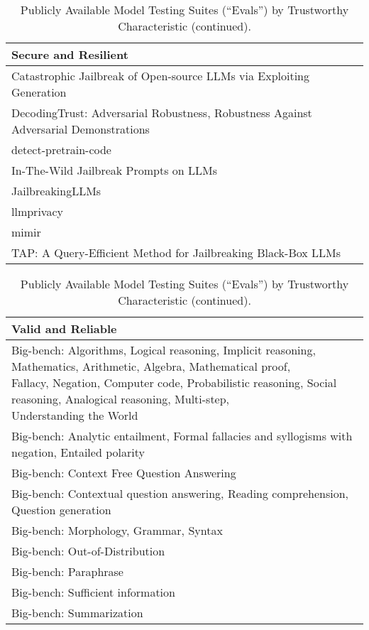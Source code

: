 \documentclass[fleqn]{article}
\begin{document}
\begin{table}[H]
	\caption*{Publicly Available Model Testing Suites (``Evals'') by Trustworthy Characteristic (continued).}
	\label{tab:low_risk_measure_by_tc_cont}
	\footnotesize
	\begin{tabular}{l}
		\toprule
		Secure and Resilient \\
		\midrule
			Catastrophic Jailbreak of Open-source LLMs via Exploiting Generation \\
			DecodingTrust: Adversarial Robustness, Robustness Against Adversarial Demonstrations \\
			detect-pretrain-code \\
			In-The-Wild Jailbreak Prompts on LLMs \\
			JailbreakingLLMs\\
			llmprivacy \\
			mimir \\
			TAP: A Query-Efficient Method for Jailbreaking Black-Box LLMs\\
		\bottomrule
	\end{tabular}
	\newline
	\vspace{10pt}
	\newline		
	\begin{tabular}{l}
		\toprule
		Valid and Reliable \\
		\midrule
			\makecell[l]{Big-bench: Algorithms, Logical reasoning, Implicit reasoning, Mathematics, Arithmetic, Algebra, Mathematical proof,\\\hspace{10pt} Fallacy, Negation, Computer code, Probabilistic reasoning, Social reasoning, Analogical reasoning, Multi-step,\\\hspace{10pt} Understanding the World} \\
		Big-bench: Analytic entailment, Formal fallacies and syllogisms with negation, Entailed polarity \\
		Big-bench: Context Free Question Answering \\
		Big-bench: Contextual question answering, Reading comprehension, Question generation \\
		Big-bench: Morphology, Grammar, Syntax \\
		Big-bench: Out-of-Distribution \\
		Big-bench: Paraphrase \\
		Big-bench: Sufficient information \\
		Big-bench: Summarization \\

\end{tabular}
\end{table}
\end{document}
